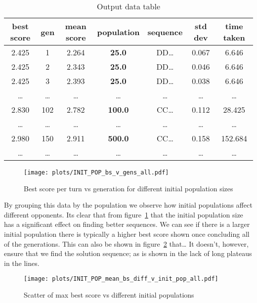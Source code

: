 \begin{table*}
    \centering
    \begin{tabular}{ccccccc}
        \toprule
        best score & gen & mean score & population & sequence & std dev & time taken \\
        \midrule
        2.425 & 1 & 2.264 & \textbf{25.0} & DD\ldots & 0.067 & 6.646\\
        2.425 & 2 & 2.343 & \textbf{25.0} & DD\ldots & 0.046 & 6.646\\
        2.425 & 3 & 2.393 & \textbf{25.0} & DD\ldots & 0.038 & 6.646\\
        \ldots  & \ldots  & \ldots  & \ldots  & \ldots  & \ldots  & \ldots \\
        2.830 & 102 & 2.782 & \textbf{100.0} & CC\ldots & 0.112 & 28.425\\
        \ldots  & \ldots  & \ldots  & \ldots  & \ldots  & \ldots  & \ldots \\
        2.980 & 150 & 2.911 & \textbf{500.0} & CC\ldots & 0.158 & 152.684\\
        \ldots  & \ldots  & \ldots  & \ldots  & \ldots  & \ldots  & \ldots \\
        \bottomrule
    \end{tabular}
    \caption{Output data table}\label{table:popCheckerDataTable}
\end{table*}

\begin{figure}[h]
    \texttt{[image: plots/INIT\_POP\_bs\_v\_gens\_all.pdf]}
    \caption{Best score per turn vs generation for different initial population sizes}\label{fig:INIT-POP-bs-v-gens-all}
\end{figure}

By grouping this data by the population we observe how initial populations affect different opponents.
Its clear that from figure~\ref{fig:INIT-POP-bs-v-gens-all} that the initial population size has a significant effect on finding better sequences.
We can see if there is a larger initial population there is typically a higher best score shown once concluding all of the generations.
This can also be shown in figure~\ref{fig:INIT-POP-mean-bs-v-init-pop-all} that\ldots
It doesn't, however, ensure that we find the solution sequence;
as is shown in the lack of long plateaus in the lines.\\

\begin{figure}[h]
    \texttt{[image: plots/INIT\_POP\_mean\_bs\_diff\_v\_init\_pop\_all.pdf]}
    \caption{Scatter of max best score vs different initial populations}\label{fig:INIT-POP-mean-bs-v-init-pop-all}
\end{figure}

